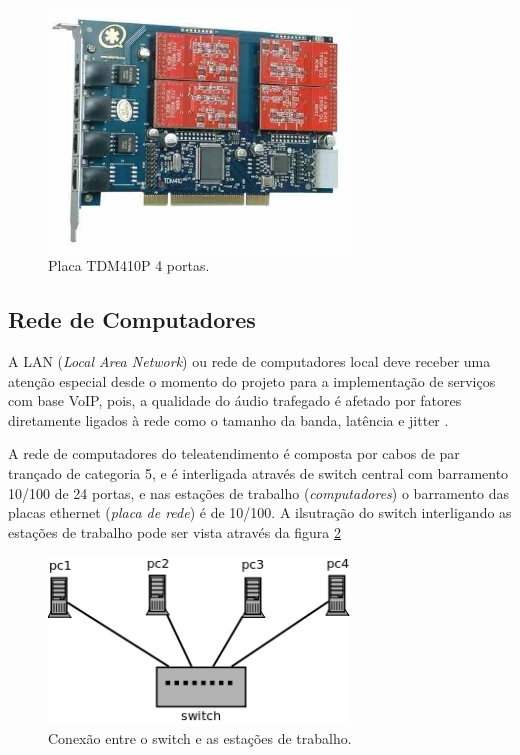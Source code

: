 \begin{figure}[h]
	\centering
	\includegraphics[width=8cm]{imagens/tdm410p.jpg}
	\caption{Placa TDM410P 4 portas.}
    \label{Figura16}
\end{figure}

\subsection{Rede de Computadores}
A LAN (\textit{Local Area Network}) ou rede de computadores local deve receber uma atenção especial desde o momento do projeto para a implementação de serviços com base VoIP, pois, a qualidade do áudio trafegado é afetado por fatores diretamente ligados à rede como o tamanho da banda, latência e jitter \cite{andersonramires2005}.

A rede de computadores do teleatendimento é composta por cabos de par trançado de categoria 5, e é interligada através de switch central com barramento 10/100 de 24 portas, e nas estações de trabalho (\textit{computadores}) o barramento das placas ethernet (\textit{placa de rede}) é de 10/100. A ilsutração do switch interligando as estações de trabalho pode ser vista através da figura \ref{Figura17}

\begin{figure}[h]
	\centering
	\includegraphics[width=8cm]{imagens/switch.png}
	\caption{Conexão entre o switch e as estações de trabalho.}
    \label{Figura17}
\end{figure}

